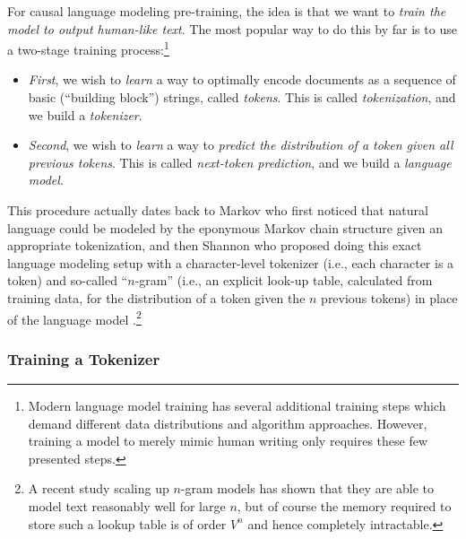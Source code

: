\documentclass[../../book-main.tex]{subfiles}
\begin{document}
For causal language modeling pre-training,  the idea is that we want to \textit{train the model to output human-like text}. The most popular way to do this by far is to use a two-stage training process:\footnote{Modern language model training has several additional training steps which demand different data distributions and algorithm approaches. However, training a model to merely mimic human writing only requires these few presented steps.} 
\begin{itemize}
    \item \textit{First}, we wish to \textit{learn} a way to optimally encode documents as a sequence of basic (``building block'') strings, called \textit{tokens}. This is called \textit{tokenization}, and we build a \textit{tokenizer}.
    \item \textit{Second}, we wish to \textit{learn} a way to \textit{predict the distribution of a token given all previous tokens}. This is called \textit{next-token prediction}, and we build a \textit{language model}.
\end{itemize}
 This procedure actually dates back to Markov who first noticed that natural language could be modeled by the eponymous Markov chain structure \citep{markov2006example} given an appropriate tokenization, and then Shannon who proposed doing this exact language modeling setup with a character-level tokenizer (i.e., each character is a token) and so-called  ``\(n\)-gram'' (i.e., an explicit look-up table, calculated from training data, for the distribution of a token given the \(n\) previous tokens) in place of the language model \citep{Shannon-1948}.\footnote{A recent study \citep{liu2024infini} scaling up \(n\)-gram models has shown that they are able to model text reasonably well for large \(n\), but of course the memory required to store such a lookup table is of order \(V^{n}\) and hence completely intractable.}

\subsubsection{Training a Tokenizer}
\end{document}
